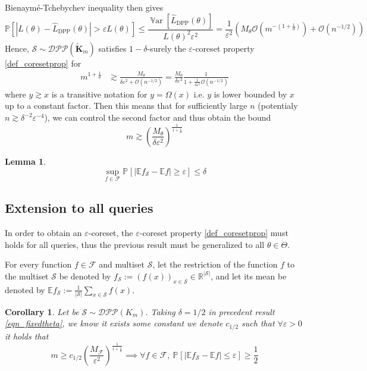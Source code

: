 \documentclass{article} %
\renewcommand{\epsilon}{\varepsilon}
\newcommand{\RR}{\mathbb{R}}
\newcommand{\PP}{\mathbb{P}}
\newcommand{\PPP}[2]{\mathbb{P}_{#1}\left[#2\right]}
\newcommand{\EE}{\mathbb{E}}
\newcommand{\OO}{\mathcal{O}}
\newcommand{\Var}{\operatorname{\mathbb V ar}}
\newcommand{\1}{\mathds{1}} %
\newcommand{\note}[2]{\todo[linecolor=red,backgroundcolor=red!25,bordercolor=red, #1]{#2}} %
\newtheorem{lemma}{Lemma}
\newtheorem{corollary}{Corollary}
\theoremstyle{definition} %
\begin{document}
Bienaym\'e-Tchebychev inequality then gives
\begin{equation}
	\PP \left[|L(\theta)-\hat L_{\textrm{DPP}}(\theta)|>\epsilon L(\theta)\right] \leq \frac{\Var[ \hat L_{\textrm{DPP}}(\theta) ] }{L(\theta)^{2}\varepsilon ^{2}} = \frac {1} {\epsilon^2}(M_\theta \OO( m ^{-(1+\frac 1 d)}) + \OO( n^{-1/2}))
\end{equation}
Hence, $\mathcal{S} \sim \mathcal{DPP}(\tilde{\boldsymbol K}_m)$ satisfies $1-\delta$-surely the $\epsilon$-coreset property \ref{def_coresetprop} for
\begin{align}
	m^{1+\frac 1 d} &\gtrsim \frac{M_\theta}{\delta \epsilon^2 + \OO(n^{-1/2})} = \frac {M_\theta} {\delta\epsilon^2} \frac{1}{1 + \frac{1}{\delta \epsilon^2}\OO(n^{-1/2})}
\end{align} 
where $y \gtrsim x$ is a transitive notation for $y = \Omega(x)$ i.e. $y$ is lower bounded by $x$ up to a constant factor.
Then this means that for sufficiently large $n$ (potentialy $n\gtrsim \delta^{-2} \epsilon^{-4}$), we can control the second factor and thus obtain the bound
\begin{equation}
	\boxed{m \gtrsim \left(\frac{M_\theta}{\delta\epsilon^2} \right)^{\frac{1}{1+\frac 1 d}} }
	\label{eqn_fixedtheta}
\end{equation}
\note{}{make that a Lemma}
\begin{lemma}
	\begin{equation}
		\sup_{f \in \mathcal{F}} \PPP{}{\lvert \EE{f_{\mathcal{S}}} - \EE{f} \rvert \geq \epsilon} \leq \delta
	\end{equation}
\end{lemma}


\subsection{Extension to all queries}
In order to obtain an $\epsilon$-coreset, the $\epsilon$-coreset property \ref{def_coresetprop} must holds for all queries, thus the previous result must be generalized to all $\theta \in \Theta$.

For every function $f \in \mathcal{F}$ and multiset $\mathcal{S}$, let the restriction of the function $f$ to the multiset $\mathcal{S}$ be denoted by $f_{\mathcal{S}} := (f(x))_{x \in \mathcal{S}} \in \RR^{|\mathcal{S} |}$, and let its mean be denoted by $\EE f_\mathcal{S} := \frac{1}{|\mathcal{S}|} \sum_{x \in \mathcal{S}} f(x)$.

\begin{corollary}
	Let be $\mathcal{S} \sim  \mathcal{DPP}(K_m)$. Taking $\delta = 1/2$ in precedent result \ref{eqn_fixedtheta}, we know it exists some constant we denote $c_{1/2}$ such that $\forall \epsilon>0$ it holds that
	\begin{equation}
		m \geq c_{1/2} \left(\frac{M_{\mathcal{F}}}{\epsilon^2} \right)^{\frac{1}{1+\frac 1 d}} \implies \forall f\in \mathcal{F},\ \PPP{}{ \lvert \EE {f_{\mathcal{S}}} - \EE f \rvert \leq \epsilon} \geq \frac 1 2
	\end{equation} 
\end{corollary}
\end{document}
